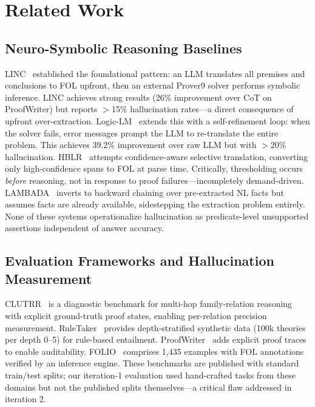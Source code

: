 \documentclass[11pt,letterpaper]{article}
\begin{document}
\section{Related Work}

\subsection{Neuro-Symbolic Reasoning Baselines}

LINC~\citep{Olausson2023} established the foundational pattern: an LLM translates all premises and conclusions to FOL upfront, then an external Prover9 solver performs symbolic inference. LINC achieves strong results (26\% improvement over CoT on ProofWriter) but reports $>$15\% hallucination rates---a direct consequence of upfront over-extraction. Logic-LM~\citep{Pan2023} extends this with a self-refinement loop: when the solver fails, error messages prompt the LLM to re-translate the entire problem. This achieves 39.2\% improvement over raw LLM but with $>$20\% hallucination. HBLR~\citep{Li2025} attempts confidence-aware selective translation, converting only high-confidence spans to FOL at parse time. Critically, thresholding occurs \emph{before} reasoning, not in response to proof failures---incompletely demand-driven. LAMBADA~\citep{Kazemi2022} inverts to backward chaining over pre-extracted NL facts but assumes facts are already available, sidestepping the extraction problem entirely. None of these systems operationalize hallucination as predicate-level unsupported assertions independent of answer accuracy.

\subsection{Evaluation Frameworks and Hallucination Measurement}

CLUTRR~\citep{Sinha2019} is a diagnostic benchmark for multi-hop family-relation reasoning with explicit ground-truth proof states, enabling per-relation precision measurement. RuleTaker~\citep{Clark2020} provides depth-stratified synthetic data (100k theories per depth 0--5) for rule-based entailment. ProofWriter~\citep{Tafjord2021} adds explicit proof traces to enable auditability. FOLIO~\citep{Han2022} comprises 1,435 examples with FOL annotations verified by an inference engine. These benchmarks are published with standard train/test splits; our iteration-1 evaluation used hand-crafted tasks from these domains but not the published splits themselves---a critical flaw addressed in iteration 2.
\end{document}
